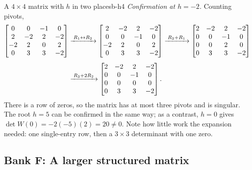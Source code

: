 \documentclass[11pt]{article}
\begin{document}
\begin{exmp}{A $4\times4$ matrix with $h$ in two places}{b-h4}
\emph{Confirmation at $h=-2$.} Counting pivots,
\begin{align*}
\begin{bmatrix}0&0&-1&0\\2&-2&2&-2\\-2&2&0&2\\0&3&3&-2\end{bmatrix}
&\xrightarrow{\;R_1\leftrightarrow R_2\;}
\begin{bmatrix}2&-2&2&-2\\0&0&-1&0\\-2&2&0&2\\0&3&3&-2\end{bmatrix}
\xrightarrow{\;R_3+R_1\;}
\begin{bmatrix}2&-2&2&-2\\0&0&-1&0\\0&0&2&0\\0&3&3&-2\end{bmatrix}\\[4pt]
&\xrightarrow{\;R_3+2R_2\;}
\begin{bmatrix}2&-2&2&-2\\0&0&-1&0\\0&0&0&0\\0&3&3&-2\end{bmatrix}.
\end{align*}
There is a row of zeros, so the matrix has at most three pivots and is singular. The root $h=5$ can be confirmed in the same way; as a contrast, $h=0$ gives $\det W(0)=-2(-5)(2)=20\neq0$. Note how little work the expansion needed: one single-entry row, then a $3\times3$ determinant with one zero.
\end{exmp}

\subsection*{Bank F: A larger structured matrix}
\end{document}
